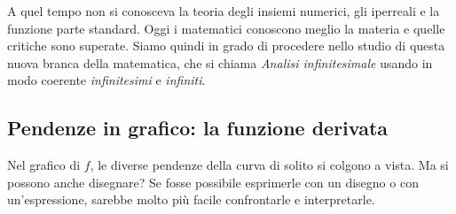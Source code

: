 A quel tempo non si conosceva la teoria degli insiemi numerici, 
gli iperreali e la funzione parte standard.
Oggi i matematici conoscono meglio la materia e quelle critiche 
sono superate. 
Siamo quindi in grado di procedere nello studio di questa nuova branca 
della matematica, che si chiama \emph{Analisi infinitesimale} 
usando in modo coerente \emph{infinitesimi} e \emph{infiniti}.

\subsection{Pendenze in grafico: la funzione derivata}
\label{subsec:pendenze_grafico}

Nel grafico di \(f\), le diverse pendenze della curva di solito si colgono a 
vista. Ma si possono anche disegnare? Se fosse possibile esprimerle con un 
disegno o con un'espressione, sarebbe molto più facile confrontarle e 
interpretarle.


